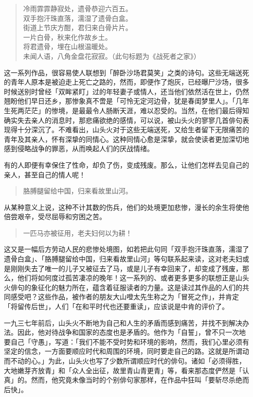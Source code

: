{\begin{quote}
    冷雨霏霏静寂处，遗骨恭迎六百五。\\
    双手抱汗珠直落，濡湿了遗骨白盒。\\
    街道上节庆方酣，君归来白骨片片。\\
    一片白骨，秋来化作故乡土。\\
    将君遗骨，埋在山根温暖处。\\
    未闻人语，八角金盘花寂寂。（此句标题为《战死者之家》）
\end{quote}

这一系列作品，很容易使人联想到「醉卧沙场君莫笑」之类的诗句。这些无端送死的青年人原本是被迫走上死亡之路的，然而，即便作了炮灰，已经曝尸沙场，很多时候送别时曾经「双眸紧盯」过的年轻妻子或情人，还当他们依然活在世上，仍然翘盼他们早日还乡，那惨象真不啻是「可怜无定河边骨，犹是春闺梦里人」。「几年生死两茫茫」的惨境，是最最令人肠断天涯，难以忍受的。当然，在他们最后得知确实失去亲人的消息时，那悲痛欲绝的感情，可以说，被山头火的寥寥几首俳句表现得十分深沉了。不难看出，山头火对于这些无端送死，又给生者留下无限痛苦的青年及其亲人，怀有深挚的同情心。这种同情心愈是深挚，就会使读者更加深切地感到侵略战争的罪恶，从而唤起人们的厌战情绪。

有的人即便有幸保住了性命，却负了伤，变成残废。那么，让他们怎样去见自己的亲人，甚至自己的情人呢！

\begin{quote}
    胳膊腿留给中国，归来看故里山河。
\end{quote}

从某种意义上说，这种不计其数的伤兵，他们的处境更加悲惨，漫长的余生将使他倍尝艰辛，受尽屈辱和穷困之苦。

\begin{quote}
    一匹马亦被征用，老夫妇何以为耕！
\end{quote}

这又是一幅后方劳动人民的悲惨处境图，如若把此句同「双手抱汗珠直落，濡湿了遗骨白盒」、「胳膊腿留给中国，归来看故里山河」等句联系起来读，这对老夫妇或是刚刚失去了唯一的儿子又被征去了马，或是儿子有幸回来了，却变成了残废，那么，他们将如何度过孤苦凄凉的晚年！这一系列的、或者更多更多的联想正是山头火俳句的象征化的魅力所在，蕴含着征服读者的力量。这是读过其作品的人们的共同感受吧？这些作品，被作者的朋友大山噔太先生称之为「冒死之作」，并肯定「将留传后世」，人们「在和平时代也还要重读」\footnotemark[13]，应该说是中肯的评价了。


一九三七年前后，山头火不断地为自己和人生的矛盾而感到痛苦，并找不到解决办法。因此，他对待战争和国家的态度也是矛盾的。他作为「自誓」，曾不只一次地要自己「守愚」\footnotemark[14]，写道：「我们不能不受时势和环境的影响，然而，我们心里必须有坚定的信念，一方面要顺应时代和周围的环境，同时要走自己的路。这就是所谓动而不动的心。」\footnotemark[15] 为此，山头火也写了少数所谓顺应时代的俳句。诸如「必须得胜，大地嫩芽齐放青」和「众人全出征，故里青山青更青」等，看来那态度俨然是「认真」\footnotemark[16] 的。然而，他究竟未像当时的个别俳句家那样，在作品中狂叫「要斩尽杀绝而后快」\footnotemark[17]。

}
